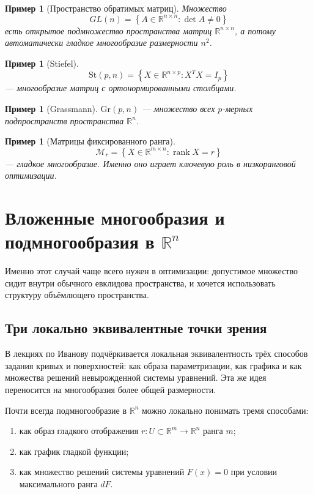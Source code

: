 \documentclass[12pt,a4paper]{article}
\theoremstyle{rudef}
\newtheorem{example}[definition]{Пример}
\theoremstyle{ruplain}
\newcommand{\R}{\mathbb{R}}
\newcommand{\rank}{\operatorname{rank}}
\newcommand{\St}{\mathrm{St}}
\newcommand{\Gr}{\mathrm{Gr}}
\newcommand{\set}[1]{\left\{#1\right\}}
\begin{document}
\begin{example}[Пространство обратимых матриц]
Множество
\[
GL(n)=\set{A\in \R^{n\times n}: \det A\neq 0}
\]
есть открытое подмножество пространства матриц $\R^{n\times n}$, а потому автоматически гладкое многообразие размерности $n^2$.
\end{example}

\begin{example}[Stiefel]
\[
\St(p,n)=\set{X\in \R^{n\times p}: X^TX=I_p}
\]
--- многообразие матриц с ортонормированными столбцами.
\end{example}

\begin{example}[Grassmann]
$\Gr(p,n)$ --- множество всех $p$-мерных подпространств пространства $\R^n$.
\end{example}

\begin{example}[Матрицы фиксированного ранга]
\[
\mathcal M_r=\set{X\in \R^{m\times n}: \rank X=r}
\]
--- гладкое многообразие. Именно оно играет ключевую роль в низкоранговой оптимизации.
\end{example}

\section{Вложенные многообразия и подмногообразия в $\R^n$}

Именно этот случай чаще всего нужен в оптимизации: допустимое множество сидит внутри обычного евклидова пространства, и хочется использовать структуру объёмлющего пространства.

\subsection{Три локально эквивалентные точки зрения}

В лекциях по Иванову подчёркивается локальная эквивалентность трёх способов задания кривых и поверхностей: как образа параметризации, как графика и как множества решений невырожденной системы уравнений. Эта же идея переносится на многообразия более общей размерности.

Почти всегда подмногообразие в $\R^n$ можно локально понимать тремя способами:
\begin{enumerate}
  \item как образ гладкого отображения $r:U\subset \R^m\to \R^n$ ранга $m$;
  \item как график гладкой функции;
  \item как множество решений системы уравнений $F(x)=0$ при условии максимального ранга $dF$.
\end{enumerate}
\end{document}
